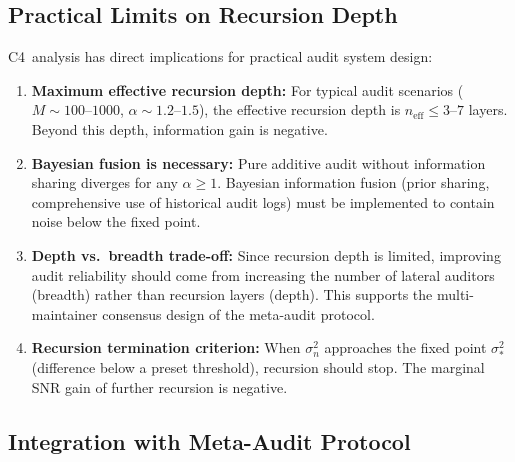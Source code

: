 \documentclass[12pt,a4paper]{article}
\theoremstyle{definition}
\newcommand{\Cfour}{\textsc{C4}}
\begin{document}
\subsection{Practical Limits on Recursion Depth}

\noindent
\Cfour\ analysis has direct implications for practical audit system design:

\begin{enumerate}[leftmargin=*, label=\textbf{---}]
    \item \textbf{Maximum effective recursion depth:} For typical audit scenarios ($M \sim 100$--$1000$, $\alpha \sim 1.2$--$1.5$), the effective recursion depth is $n_{\text{eff}} \leq 3$--$7$ layers. Beyond this depth, information gain is negative.

    \item \textbf{Bayesian fusion is necessary:} Pure additive audit without information sharing diverges for any $\alpha \geq 1$. Bayesian information fusion (prior sharing, comprehensive use of historical audit logs) must be implemented to contain noise below the fixed point.

    \item \textbf{Depth vs.\ breadth trade-off:} Since recursion depth is limited, improving audit reliability should come from increasing the number of lateral auditors (breadth) rather than recursion layers (depth). This supports the multi-maintainer consensus design of the meta-audit protocol.

    \item \textbf{Recursion termination criterion:} When $\sigma_n^2$ approaches the fixed point $\sigma_*^2$ (difference below a preset threshold), recursion should stop. The marginal SNR gain of further recursion is negative.
\end{enumerate}

\subsection{Integration with Meta-Audit Protocol}
\end{document}
